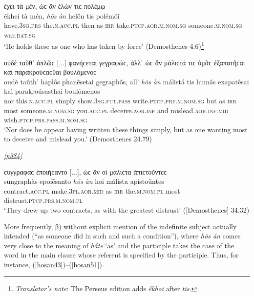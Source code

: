 \begin{exe}
\ex ἔχει τὰ μέν, ὡϲ ἂν ἑλών τιϲ πολέμῳ\\
\gll ékhei tà mén, \emph{hōs} \emph{àn} helṓn tis polémōi\\
have.\textsc{3sg.prs} the.\textsc{n.acc.pl} then as \textsc{irr}
take.\textsc{ptcp.aor.m.nom.sg} someone.\textsc{m.nom.sg} war.\textsc{dat.sg}\\
\trans `He holds these as one who has taken by force' (Demosthenes 4.6)\footnote{\emph{Translator's note}: The Perseus edition adds \textit{ékhoi} after \textit{tis}.}
\label{hosan40}
\end{exe}

\begin{exe}
\ex οὐδὲ ταῦθ᾽ ἁπλῶϲ {[}...{]} φανήϲεται γεγραφώϲ, ἀλλ᾽ ὡϲ ἂν μάλιϲτά τιϲ ὑμᾶϲ ἐξαπατῆϲαι καὶ παρακρούϲαϲθαι βουλόμενοϲ\\
\gll oudè taûth' haplôs phanḗsetai gegraphṓs, all' \emph{hōs} \emph{àn} málistá tis humâs exapatêsai kaì parakroúsasthai boulómenos\\
nor this.\textsc{n.acc.pl} simply show.\textsc{3sg.fut.pass} write.\textsc{ptcp.prf.m.nom.sg} but as \textsc{irr} most someone.\textsc{m.nom.sg} you.\textsc{acc.pl} deceive.\textsc{aor.inf} and mislead.\textsc{aor.inf.mid} wish.\textsc{ptcp.prs.pass.m.nom.sg}\\
\trans `Nor does he appear having written these things simply, but as one wanting most to deceive and mislead you.' (Demosthenes 24.79)
\label{hosan41}
\end{exe}

\hyperlink{p384}{\emph{[p384]}}

\begin{exe}
\ex ϲυγγραφὰϲ ἐποιήϲαντο {[}...{]}, ὡϲ ἂν οἱ μάλιϲτα ἀπιϲτοῦντεϲ\\
\gll sungraphàs epoiḗsanto \emph{hōs} \emph{àn} hoi málista apistoûntes\\
contract.\textsc{acc.pl} make.\textsc{3pl.aor.mid} as \textsc{irr} the.\textsc{m.nom.pl} most distrust.\textsc{ptcp.prs.m.nom.pl}\\
\trans `They drew up two contracts, as with the greatest distrust' ({[}Demosthenes{]} 34.32)
\label{hosan42}
\end{exe}

More frequently, β) without explicit mention of the indefinite subject actually intended (``as someone did in such and such a condition''), where \emph{hōs án} comes very close to the meaning of \emph{háte} `as' and the participle takes the case of the word in the main clause whose referent is specified by the participle. Thus, for instance, (\ref{hosan43})--(\ref{hosan51}).

